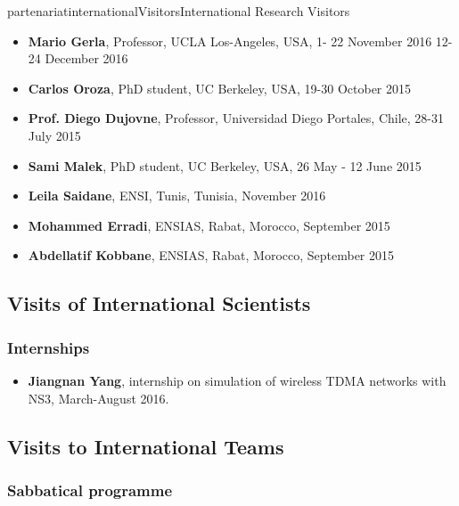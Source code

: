 \documentclass{ra2016}
\begin{document}
\begin{module}{partenariat}{internationalVisitors}{International Research Visitors}
\begin{itemize}
     \item{\bf Mario Gerla}, Professor, UCLA Los-Angeles, USA, 1- 22 November 2016  12-24 December 2016
    \item{\bf Carlos Oroza}, PhD student, UC Berkeley, USA, 19-30 October 2015
    \item{\bf Prof. Diego Dujovne}, Professor, Universidad Diego Portales, Chile, 28-31 July 2015
    \item{\bf Sami Malek}, PhD student, UC Berkeley, USA, 26 May - 12 June 2015
    \item{\bf Leila Saidane}, ENSI, Tunis, Tunisia, November 2016 
    \item{\bf Mohammed Erradi}, ENSIAS, Rabat, Morocco, September 2015
    \item{\bf Abdellatif Kobbane}, ENSIAS, Rabat, Morocco, September 2015
\end{itemize}
\subsection{Visits of International Scientists}

   \subsubsection{Internships}

\begin{itemize}
    \item{\bf Jiangnan Yang}, internship on simulation of wireless TDMA networks with NS3, March-August 2016.
\end{itemize}



\subsection{Visits to International Teams}
   \subsubsection{Sabbatical programme}


\end{module}
\end{document}
